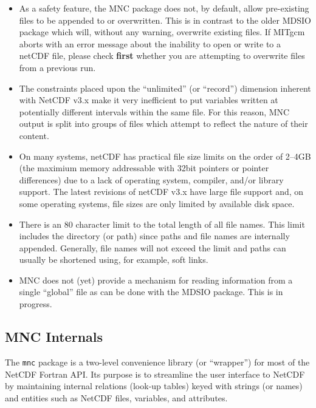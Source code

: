 \begin{itemize}
\item As a safety feature, the MNC package does not, by default, allow
  pre-existing files to be appended to or overwritten.  This is in
  contrast to the older MDSIO package which will, without any warning,
  overwrite existing files.  If MITgcm aborts with an error message
  about the inability to open or write to a netCDF file, please check
  \textbf{first} whether you are attempting to overwrite files from a
  previous run.

\item The constraints placed upon the ``unlimited'' (or ``record'')
  dimension inherent with NetCDF v3.x make it very inefficient to put
  variables written at potentially different intervals within the same
  file.  For this reason, MNC output is split into groups of files
  which attempt to reflect the nature of their content.
  
\item On many systems, netCDF has practical file size limits on the
  order of 2--4GB (the maximium memory addressable with 32bit pointers
  or pointer differences) due to a lack of operating system, compiler,
  and/or library support.  The latest revisions of netCDF v3.x have
  large file support and, on some operating systems, file sizes are
  only limited by available disk space.
  
\item There is an 80 character limit to the total length of all file
  names.  This limit includes the directory (or path) since paths and
  file names are internally appended.  Generally, file names will not
  exceed the limit and paths can usually be shortened using, for
  example, soft links.
  
\item MNC does not (yet) provide a mechanism for reading information
  from a single ``global'' file as can be done with the MDSIO
  package.  This is in progress.
\end{itemize}


\subsection{MNC Internals}

The \texttt{mnc} package is a two-level convenience library (or
``wrapper'') for most of the NetCDF Fortran API.  Its purpose is to
streamline the user interface to NetCDF by maintaining internal
relations (look-up tables) keyed with strings (or names) and entities
such as NetCDF files, variables, and attributes.

